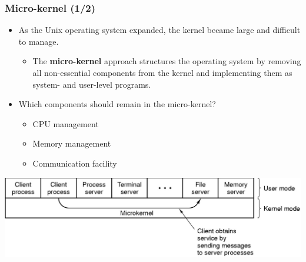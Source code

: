 \documentclass[CJKutf8,xcolor=pdftex,dvipsnames,table]{beamer}
\begin{document}
\begin{CJK*}{UTF8}{song}
  \begin{frame}
    \frametitle{Micro-kernel (1/2)} \pause
    \begin{itemize}
    \item{As the Unix operating system expanded, the kernel became large and difficult to manage.} \pause
      \begin{itemize}
      \item{The \textbf{micro-kernel} approach structures the operating system by removing all non-essential components from the kernel and implementing them as system- and user-level programs.} \pause
      \end{itemize}
    \item{Which components should remain in the micro-kernel?} \pause
      \begin{itemize}
      \item{CPU management} \pause
      \item{Memory management} \pause
      \item{Communication facility} \pause
      \end{itemize}
    \end{itemize}
    \begin{center}
      \includegraphics[scale=.2]{mosv2f1-27}
    \end{center}
  \end{frame}
  

\end{CJK*}
\end{document}
